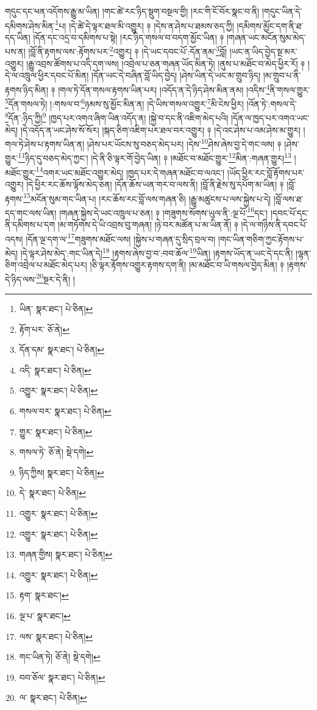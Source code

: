 གདུང་དང་ཕན་འདོགས་རྒྱུ་མ་ཡིན། །གང་ཚེ་རང་ཉིད་སྡུག་བསྔལ་གྱི། །རང་གི་ངོ་བོར་སྣང་བ་ནི། །གདུང་ཡིན་དེ་དམིགས་ཤེས་མིན་\footnote{ཡིན་  སྣར་ཐང་།  པེ་ཅིན། }པ། །དེ་ཚེ་དེ་ལྟར་ཐལ་མི་འགྱུར། ༈ །དེས་ན་ཤེས་པ་ཐམས་ཅད་ཀྱི། །དམིགས་མྱོང་དག་ནི་ཐ་དད་ཡིན། །དོན་དང་འདྲ་བ་དམིགས་པ་སྟེ། །རང་ཉིད་གསལ་བ་བདག་མྱོང་ཡིན། ༈ །གཞན་ཡང་མངོན་སུམ་མེད་པས་ན། །བློ་ནི་རྟགས་ལས་:རྟོགས་པར་\footnote{རྟོག་པར་  ཅོ་ནེ། }འགྱུར། ༈ །དེ་ཡང་དབང་པོ་:དོན་ནམ་\footnote{དོན་དམ་  སྣར་ཐང་།  པེ་ཅིན། }བློ། །ཡང་ན་ཡིད་བྱེད་སྔ་མར་འགྱུར། །རྒྱུ་འབྲས་ཚོགས་པ་འདི་དག་ལས། །འབྲེལ་པ་ཅན་གཞན་ཡོད་མིན་ཏེ། །ནུས་པ་མཐོང་བ་མེད་ཕྱིར་རོ། ༈ །དེ་ལ་འཁྲུལ་ཕྱིར་དབང་པོ་མིན། །དོན་ཡང་དེ་བཞིན་བློ་ཡིད་བྱེད། །ཤེས་ཡིན་དེ་ཡང་མ་གྲུབ་ཉིད། །མ་གྲུབ་པ་ནི་རྟགས་ཉིད་མིན། ༈ །གལ་ཏེ་དོན་གསལ་རྟགས་ཡིན་པར། །འདོད་ན་དེ་ཉིད་ཤེས་མིན་ནམ། །འདིས་\footnote{འདི་  སྣར་ཐང་།  པེ་ཅིན། }ནི་གསལ་གྱུར་\footnote{འགྱུར་  སྣར་ཐང་།  པེ་ཅིན། }དོན་གསལ་ཏེ། །:གསལ་བ་\footnote{གསལ་བར་  སྣར་ཐང་།  པེ་ཅིན། }ཉམས་སུ་མྱོང་མིན་ན། །དེ་ཡིས་གསལ་འགྱུར་\footnote{གྱུར་  སྣར་ཐང་།  པེ་ཅིན། }མི་ངེས་ཕྱིར། །འོན་ཏེ་:གསལ་དེ་\footnote{གསལ་ཏེ་  ཅོ་ནེ།  སྡེ་དགེ། }དོན་:ཉིད་ཀྱི།\footnote{ཉིད་ཀྱིས།  སྣར་ཐང་།  པེ་ཅིན། } །ཁྱད་པར་འགའ་ཞིག་ཡིན་འདོད་ན། །སྐྱེ་བ་དང་ནི་འཇིག་མེད་པའི། །དོན་ལ་ཁྱད་པར་འགའ་ཡང་མེད། །དེ་འདོད་ན་ཡང་ཤེས་སོ་སོར། །སྐད་ཅིག་འཇིག་པར་ཐལ་བར་འགྱུར། ༈ །དེ་འང་ཤེས་པ་འམ་ཤེས་མ་གྱུར། །གལ་ཏེ་ཤེས་པ་རྟགས་ཡིན་ན། །ཤེས་པར་ཡོངས་སུ་བཅད་མེད་པར། །དེས་\footnote{དེ་  སྣར་ཐང་།  པེ་ཅིན། }ཤེས་ཞེས་བྱ་དེ་གང་ལས། ༈ །ཤེས་གྱུར་\footnote{འགྱུར་  སྣར་ཐང་།  པེ་ཅིན། }ཉིད་དུ་བཅད་མེད་ཀྱང་། །དེ་ནི་ཅི་ལྟར་གོ་བྱེད་ཡིན། ༈ །མཐོང་བ་མཐོང་གྱུར་\footnote{འགྱུར་  སྣར་ཐང་།  པེ་ཅིན། }མིན་:གཞན་གྱུར།\footnote{གཞན་གྱིས།  སྣར་ཐང་།  པེ་ཅིན། } །མཐོང་གྱུར་\footnote{འགྱུར་  སྣར་ཐང་།  པེ་ཅིན། }འགར་ཡང་མཐོང་འགྱུར་མེད། །ཁྱད་པར་དེ་གཞན་མཐོང་བ་ལའང་། །ཡོད་ཕྱིར་རང་བློ་རྟོགས་པར་འགྱུར། །དེ་ཕྱིར་རང་ཆོས་ལྟོས་མེད་ཅན། །དོན་ཆོས་ཡན་གར་བ་ལས་ནི། །བློ་ནི་རྗེས་སུ་དཔོག་མ་ཡིན། ༈ །བློ་རྟགས་\footnote{རྟག་  སྣར་ཐང་། }མངོན་སུམ་གང་ཡིན་པ། །རང་ཆོས་རང་བློ་ལས་གཞན་ཅི། །རྒྱུ་མཚུངས་པ་ལས་སྐྱེས་པ་དེ། །བློ་ལས་ཐ་དད་གང་ལས་ཡིན། །གཞན་སྐྱེས་དེ་ཡང་འཁྲུལ་པ་ཅན། ༈ །གཟུགས་སོགས་ཡུལ་ནི་:ལྔ་པོ་\footnote{ལྔ་པ་  སྣར་ཐང་། }དང་། །དབང་པོ་དང་ནི་དམིགས་པ་དག །མ་གཏོགས་དེ་ཡི་འབྲས་བུ་གཞན། །ཉེ་བར་མཚོན་པ་མ་ཡིན་ནོ། ༈ །དེ་ལ་གཉིས་ནི་དབང་པོ་འདས། །དོན་ལྔ་དག་ལ་\footnote{ལས་  སྣར་ཐང་།  པེ་ཅིན། }གཟུགས་མཐོང་ལས། །སྐྱེས་པ་གཞན་དུ་སྲིད་བྲལ་བ། །གང་ཡིན་གཅིག་ཀྱང་རྟོགས་པ་མེད། །དེ་ལྟར་ཤེས་མེད་:གང་ཡིན་དེ།\footnote{གང་ཡིན་ཏེ།  ཅོ་ནེ།  སྡེ་དགེ། } །རྟགས་ཞེས་བྱ་བ་:བབ་ཆོལ་\footnote{བབ་ཅོལ་  སྣར་ཐང་།  པེ་ཅིན། }ཡིན། །རྟགས་ཡོད་ན་ཡང་དེ་དང་ནི། །ལྷན་ཅིག་འབྲེལ་པ་མཐོང་མེད་པར། །ཅི་ལྟར་རྟོགས་འགྱུར་རྟགས་དག་ནི། །མ་མཐོང་བ་ཡི་གསལ་བྱེད་མིན། ༈ །རྟགས་དེ་ཉིད་ལས་\footnote{ལ་  སྣར་ཐང་།  པེ་ཅིན། }སྔར་དེ་ནི། །
